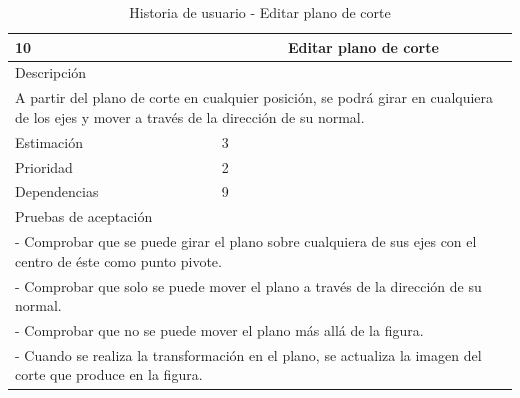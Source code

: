 \begin{table}[H]
	\begin{center}
		\begin{tabular} {|l|c|l|}
			\hline
			10 & \multicolumn{2}{c|}{Editar plano de corte} \\ \hline \hline
			\multicolumn{3}{|l|}{Descripción} \\ \hline
			\multicolumn{3}{|p{12cm}|}{A partir del plano de corte en cualquier posición, se podrá girar en cualquiera de los ejes y mover a través de la dirección de su normal.} \\ \hline
			\multicolumn{2}{|l|}{Estimación} & 3 \\ \hline
			\multicolumn{2}{|l|}{Prioridad} & 2 \\ \hline
			\multicolumn{2}{|l|}{Dependencias} & 9 \\ \hline
			\multicolumn{3}{|l|}{Pruebas de aceptación} \\ \hline
			\multicolumn{3}{|p{12cm}|}{ - Comprobar que se puede girar el plano sobre cualquiera de sus ejes con el centro de éste como punto pivote.} \\ 
			\multicolumn{3}{|p{12cm}|}{ - Comprobar que solo se puede mover el plano a través de la dirección de su normal.} \\ 
			\multicolumn{3}{|p{12cm}|}{ - Comprobar que no se puede mover el plano más allá de la figura.} \\ 
			\multicolumn{3}{|p{12cm}|}{ - Cuando se realiza la transformación en el plano, se actualiza la imagen del corte que produce en la figura.} \\ \hline
		\end{tabular}
	\end{center}
	\caption{Historia de usuario - Editar plano de corte}
	\label{tab:hu_editar_plano_de_corte}
\end{table}

